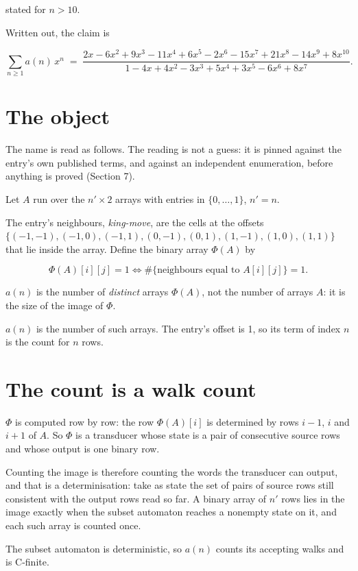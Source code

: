 \documentclass[11pt]{article}
\theoremstyle{definition}
\begin{document}
stated for $n > 10$.

Written out, the claim is

\[\sum_{n \ge 1} a(n)\,x^n \;=\; \frac{2x - 6x^{2} + 9x^{3} - 11x^{4} + 6x^{5} - 2x^{6} - 15x^{7} + 21x^{8} - 14x^{9} + 8x^{10}}{1 - 4x + 4x^{2} - 3x^{3} + 5x^{4} + 3x^{5} - 6x^{6} + 8x^{7}}.\]

\section{The object}

The name is read as follows. The reading is not a guess: it is pinned against the entry's own published terms, and against an independent enumeration, before anything is proved (Section 7).

Let $A$ run over the $n' \times 2$ arrays with entries in $\{0,\dots,1\}$, $n' = n$.

The entry's neighbours, {\itshape king-move}, are the cells at the offsets $\{(-1,-1), (-1,0), (-1,1), (0,-1), (0,1), (1,-1), (1,0), (1,1)\}$ that lie inside the array. Define the binary array $\Phi(A)$ by

\[\Phi(A)[i][j] = 1 \iff \#\{\text{neighbours equal to } A[i][j]\} = 1.\]

$a(n)$ is the number of {\itshape distinct} arrays $\Phi(A)$, not the number of arrays $A$: it is the size of the image of $\Phi$.

$a(n)$ is the number of such arrays. The entry's offset is 1, so its term of index $n$ is the count for $n$ rows.

\section{The count is a walk count}

$\Phi$ is computed row by row: the row $\Phi(A)[i]$ is determined by rows $i-1$, $i$ and $i+1$ of $A$. So $\Phi$ is a transducer whose state is a pair of consecutive source rows and whose output is one binary row.

Counting the image is therefore counting the words the transducer can output, and that is a determinisation: take as state the set of pairs of source rows still consistent with the output rows read so far. A binary array of $n'$ rows lies in the image exactly when the subset automaton reaches a nonempty state on it, and each such array is counted once.

The subset automaton is deterministic, so $a(n)$ counts its accepting walks and is C-finite.
\end{document}
